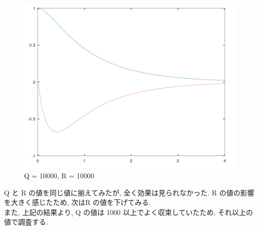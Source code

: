 \documentclass{jsarticle}
\begin{document}
\begin{figure}[h!]
\begin{minipage}{0.325\linewidth}
    \centering
    \includegraphics[width=\linewidth]{./fig/q10000_r10000.png}
    \caption{Q = 10000, R = 10000}
  \end{minipage}
\end{figure}

Q と R の値を同じ値に揃えてみたが, 全く効果は見られなかった.
R の値の影響を大きく感じたため, 次は\hspace*{1zw}R の値を下げてみる.\\

また, 上記の結果より, Q の値は 1000 以上でよく収束していたため, それ以上の値で調査する.
\end{document}
